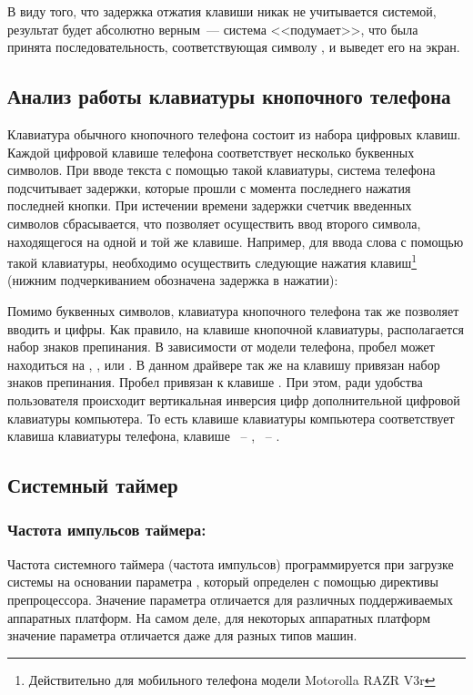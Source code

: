 В виду того, что задержка отжатия клавиши  никак не учитывается системой,
результат будет абсолютно верным~--- система <<подумает>>, что была принята последовательность,
соответствующая символу , и выведет его на экран.

\subsection{Анализ работы клавиатуры кнопочного телефона}
Клавиатура обычного кнопочного телефона состоит из набора цифровых клавиш. Каждой цифровой клавише
телефона соответствует несколько буквенных символов. При вводе текста
с помощью такой клавиатуры, система телефона подсчитывает задержки, которые прошли с момента
последнего нажатия последней кнопки. При истечении времени задержки счетчик введенных символов сбрасывается,
что позволяет осуществить ввод второго символа, находящегося на одной и той же клавише.
Например, для ввода слова  с помощью такой клавиатуры, необходимо
осуществить следующие нажатия клавиш\footnote{Действительно для мобильного телефона модели
Motorolla RAZR V3r} (нижним подчеркиванием обозначена задержка в нажатии):\par{}
\newpar

Помимо буквенных символов, клавиатура кнопочного телефона так же позволяет вводить и цифры.
Как правило, на клавише  кнопочной клавиатуры, располагается набор знаков препинания.
В зависимости от модели телефона, пробел может находиться на , , \key{*} или \key{\#}.
В данном драйвере так же на клавишу  привязан набор знаков препинания. Пробел привязан
к клавише . При этом, ради удобства пользователя происходит вертикальная инверсия 
цифр дополнительной цифровой клавиатуры компьютера. То есть клавише  клавиатуры компьютера
соответствует клавиша  клавиатуры телефона, клавише ~-- , ~-- .

\subsection{Системный таймер} \label{sec:jiffies}
\subsubsection{Частота импульсов таймера: }
Частота системного таймера (частота импульсов) программируется при загрузке системы на основании
параметра , который определен с помощью директивы препроцессора.
Значение параметра  отличается для различных поддерживаемых аппаратных платформ. На самом деле,
для некоторых аппаратных платформ значение параметра  отличается даже для разных типов машин.
\newpar

